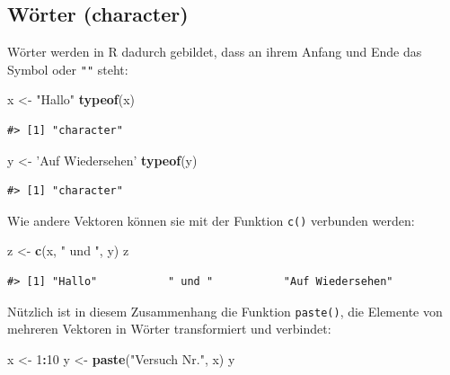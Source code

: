 \documentclass[]{book}
\newenvironment{Shaded}{\begin{snugshade}}{\end{snugshade}}
\newcommand{\KeywordTok}[1]{\textcolor[rgb]{0.13,0.29,0.53}{\textbf{#1}}}
\newcommand{\DecValTok}[1]{\textcolor[rgb]{0.00,0.00,0.81}{#1}}
\newcommand{\StringTok}[1]{\textcolor[rgb]{0.31,0.60,0.02}{#1}}
\newcommand{\OperatorTok}[1]{\textcolor[rgb]{0.81,0.36,0.00}{\textbf{#1}}}
\newcommand{\NormalTok}[1]{#1}
\begin{document}
\subsection{Wörter (character)}\label{worter-character}

Wörter werden in R dadurch gebildet, dass an ihrem Anfang und Ende das
Symbol \texttt{\textquotesingle{}} oder \texttt{""} steht:

\begin{Shaded}
\begin{Highlighting}[]
\NormalTok{x <-}\StringTok{ "Hallo"}
\KeywordTok{typeof}\NormalTok{(x)}
\end{Highlighting}
\end{Shaded}

\begin{verbatim}
#> [1] "character"
\end{verbatim}

\begin{Shaded}
\begin{Highlighting}[]
\NormalTok{y <-}\StringTok{ 'Auf Wiedersehen'}
\KeywordTok{typeof}\NormalTok{(y)}
\end{Highlighting}
\end{Shaded}

\begin{verbatim}
#> [1] "character"
\end{verbatim}

Wie andere Vektoren können sie mit der Funktion \texttt{c()} verbunden
werden:

\begin{Shaded}
\begin{Highlighting}[]
\NormalTok{z <-}\StringTok{ }\KeywordTok{c}\NormalTok{(x, }\StringTok{" und "}\NormalTok{, y)}
\NormalTok{z}
\end{Highlighting}
\end{Shaded}

\begin{verbatim}
#> [1] "Hallo"           " und "           "Auf Wiedersehen"
\end{verbatim}

Nützlich ist in diesem Zusammenhang die Funktion \texttt{paste()}, die
Elemente von mehreren Vektoren in Wörter transformiert und verbindet:

\begin{Shaded}
\begin{Highlighting}[]
\NormalTok{x <-}\StringTok{ }\DecValTok{1}\OperatorTok{:}\DecValTok{10}
\NormalTok{y <-}\StringTok{ }\KeywordTok{paste}\NormalTok{(}\StringTok{"Versuch Nr."}\NormalTok{, x)}
\NormalTok{y}
\end{Highlighting}
\end{Shaded}
\end{document}
